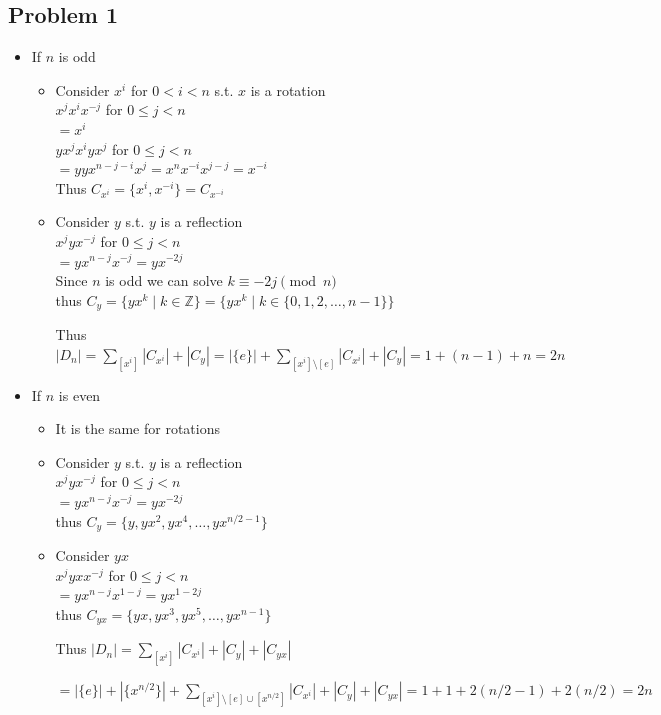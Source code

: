 \documentclass[12pt, letterpaper]{article}
\theoremstyle{definition}
\newcommand{\Z}{\mathbb{Z}}
\begin{document}
\pagestyle{fancy}
\fancyhf{}
\fancyhead[ROE]{\thepage}

\subsection*{Problem 1}
\begin{itemize}
    \item If $n$ is odd
    \begin{itemize}
        \item Consider $x^i$ for $0 < i < n$ s.t. $x$ is a rotation\\
        $x^jx^ix^{-j}$ for $0 \leq j < n$\\
        $=x^i$\\
        $yx^jx^iyx^{j}$ for $0 \leq j < n$\\
        $=yyx^{n-j-i}x^{j}=x^nx^{-i}x^{j-j}=x^{-i}$\\
        Thus $C_{x^{i}}=\{x^i,x^{-i}\}=C_{x^{-i}}$
        \item Consider $y$ s.t. $y$ is a reflection\\
        $x^jyx^{-j}$ for $0 \leq j < n$\\
        $=yx^{n-j}x^{-j}=yx^{-2j}$\\
        Since $n$ is odd we can solve $k \equiv -2j \pmod{n}$\\
        thus $C_y=\{yx^k \mid k \in \Z\}=\{yx^k \mid k \in \{0,1,2,\dots,n-1\}\}$
        
        Thus $|D_n|=\sum\limits_{[x^i]}|C_{x^i}|+|C_y|=|\{e\}|+\sum\limits_{[x^i]\setminus [e]}|C_{x^i}|+|C_y|=1+(n-1)+n=2n$
    \end{itemize}
    \item If $n$ is even
    \begin{itemize}
        \item It is the same for rotations
        \item Consider $y$ s.t. $y$ is a reflection\\
        $x^jyx^{-j}$ for $0 \leq j < n$\\
        $=yx^{n-j}x^{-j}=yx^{-2j}$\\
        thus $C_y=\{y,yx^2,yx^4,\dots , yx^{n/2 - 1}\}$
        \item Consider $yx$\\
        $x^jyxx^{-j}$ for $0 \leq j < n$\\
        $=yx^{n-j}x^{1-j}=yx^{1-2j}$\\
        thus $C_{yx}=\{yx,yx^3,yx^5,\dots , yx^{n-1}\}$

        Thus $|D_n|=\sum\limits_{[x^i]}|C_{x^i}|+|C_y|+|C_{yx}|$

        $=|\{e\}|+|\{x^{n/2}\}|+\sum\limits_{[x^i]\setminus [e]\cup[x^{n/2}]}|C_{x^i}|+|C_y|+|C_{yx}|=1+1+2(n/2-1)+2(n/2)=2n$
    \end{itemize}
\end{itemize}
\end{document}
